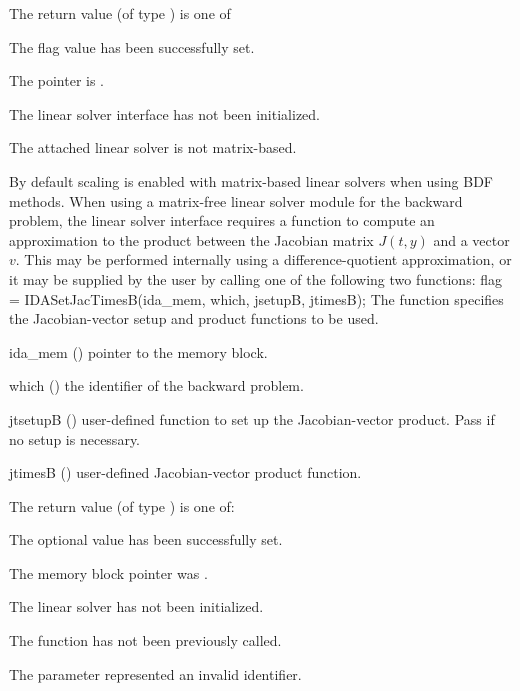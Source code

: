 {
  The return value  (of type ) is one of
  \begin{args}
  \item[\Id{IDALS\_SUCCESS}]
    The flag value has been successfully set.
  \item[\Id{IDALS\_MEM\_NULL}]
    The  pointer is .
  \item[\Id{IDALS\_LMEM\_NULL}]
    The {\idals} linear solver interface has not been initialized.
  \item[\Id{IDALS\_ILL\_INPUT}]
    The attached linear solver is not matrix-based.
  \end{args}
}
{
  By default scaling is enabled with matrix-based linear solvers when using BDF
  methods.
}
When using a matrix-free linear solver module for the backward
problem, the {\idals} linear solver interface requires a function to
compute an approximation to the product between the Jacobian matrix
$J(t,y)$ and a vector $v$.  This may be performed internally using a
difference-quotient approximation, or it may be supplied by the user
by calling one of the following two functions:
{
  flag = IDASetJacTimesB(ida\_mem, which, jsetupB, jtimesB);
}
{
  The function  specifies the Jacobian-vector
  setup and product functions to be used.
}
{
  \begin{args}
  \item[ida\_mem] ()
    pointer to the {\idas} memory block.
  \item[which] ()
    the identifier of the backward problem.
  \item[jtsetupB] ()
    user-defined function to set up the Jacobian-vector product.
    Pass  if no setup is necessary.
  \item[jtimesB] ()
    user-defined Jacobian-vector product function.
  \end{args}
}
{
  The return value  (of type ) is one of:
  \begin{args}
  \item[\Id{IDALS\_SUCCESS}]
    The optional value has been successfully set.
  \item[\Id{IDALS\_MEM\_NULL}]
    The  memory block pointer was .
  \item[\Id{IDALS\_LMEM\_NULL}]
    The {\idals} linear solver has not been initialized.
  \item[\Id{IDALS\_NO\_ADJ}]
    The function  has not been previously called.
  \item[\Id{IDALS\_ILL\_INPUT}]
    The parameter  represented an invalid identifier.
  \end{args}
}
